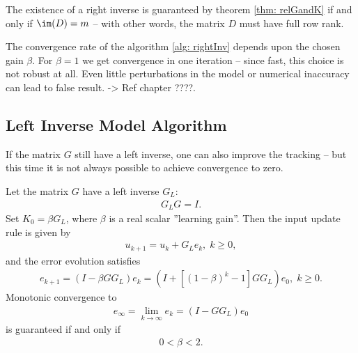 The existence of a right inverse is guaranteed by theorem \ref{thm: relGandK} if and only if $\im(D) = m$ -- with other words, the matrix $D$ must have full row rank. 

The convergence rate of the algorithm \ref{alg: rightInv} depends upon the chosen gain $\beta$. For $\beta = 1$ we get convergence in one iteration -- since fast, this choice is not robust at all. Even little perturbations in the model or numerical inaccuracy can lead to false result. -> Ref chapter ????. 

\subsection{Left Inverse Model Algorithm}
If the matrix $G$ still have a left inverse, one can also improve the tracking -- but this time it is not always possible to achieve convergence to zero. 

\begin{alg}
	\label{alg: leftInv}
	Let the matrix $G$ have a left inverse $G_L$: 
	\begin{align*}
	G_L G = I. 
	\end{align*}
	Set $K_0 = \beta G_L$, where $\beta$ is a real scalar ''learning gain''. Then the input update rule is given by 
	\begin{align}
	u_{k+1} = u_k + G_L e_k, \; k\geq 0,
	\end{align} 
	and the error evolution satisfies 
	\begin{align}
	\label{eq: errLeftInv}
	e_{k+1} = (I- \beta G G_L) e_k = (I+  \left[(1-\beta)^k - 1\right] G G_L) e_0, \; k\geq 0.
	\end{align}
	Monotonic convergence to 
	\begin{align}
	\label{eq: leftInvErrLim} 
	e_\infty  = \lim_{k\to\infty} e_k = (I - G G_L)e_0
	\end{align} is guaranteed if and only if 
	\begin{align*}
	0 <\beta < 2.
	\end{align*}
\end{alg} 

